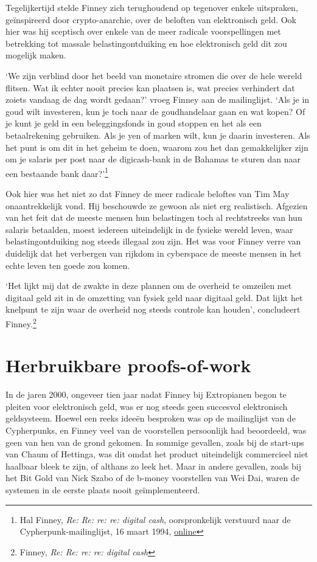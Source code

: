 \documentclass[
  a5paper,
  smalldemyvopaper,11pt,twoside,onecolumn,openright,extrafontsizes,
hidelinks]{memoir}
\begin{document}
Tegelijkertijd stelde Finney zich terughoudend op tegenover enkele
uitspraken, geïnspireerd door crypto-anarchie, over de beloften van
elektronisch geld. Ook hier was hij sceptisch over enkele van de meer
radicale voorspellingen met betrekking tot massale belastingontduiking
en hoe elektronisch geld dit zou mogelijk maken.

`We zijn verblind door het beeld van monetaire stromen die over de hele
wereld flitsen. Wat ik echter nooit precies kan plaatsen is, wat precies
verhindert dat zoiets vandaag de dag wordt gedaan?' vroeg Finney aan de
mailinglijst. `Als je in goud wilt investeren, kun je toch naar de
goudhandelaar gaan en wat kopen? Of je kunt je geld in een
beleggingsfonds in goud stoppen en het als een betaalrekening gebruiken.
Als je yen of marken wilt, kun je daarin investeren. Als het punt is om
dit in het geheim te doen, waarom zou het dan gemakkelijker zijn om je
salaris per post naar de digicash-bank in de Bahamas te sturen dan naar
een bestaande bank daar?'\footnote{Hal Finney, \emph{Re: Re: re: re:
  digital cash}, oorspronkelijk verstuurd naar de
  Cypherpunk-mailinglijst, 16 maart 1994,
  \href{https://cypherpunks.venona.com/date/1994/03/msg00694.html}{online}}

Ook hier was het niet zo dat Finney de meer radicale beloftes van Tim
May onaantrekkelijk vond. Hij beschouwde ze gewoon als niet erg
realistisch. Afgezien van het feit dat de meeste mensen hun belastingen
toch al rechtstreeks van hun salaris betaalden, moest iedereen
uiteindelijk in de fysieke wereld leven, waar belastingontduiking nog
steeds illegaal zou zijn. Het was voor Finney verre van duidelijk dat
het verbergen van rijkdom in cyberspace de meeste mensen in het echte
leven ten goede zou komen.

`Het lijkt mij dat de zwakte in deze plannen om de overheid te omzeilen
met digitaal geld zit in de omzetting van fysiek geld naar digitaal
geld. Dat lijkt het knelpunt te zijn waar de overheid nog steeds
controle kan houden', concludeert Finney.\footnote{Finney, \emph{Re: Re:
  re: re: digital cash}}

\section{Herbruikbare proofs-of-work}\label{herbruikbare-proofs-of-work}

In de jaren 2000, ongeveer tien jaar nadat Finney bij Extropianen begon
te pleiten voor elektronisch geld, was er nog steeds geen succesvol
elektronisch geldsysteem. Hoewel een reeks ideeën besproken was op de
mailinglijst van de Cypherpunks, en Finney veel van de voorstellen
persoonlijk had beoordeeld, was geen van hen van de grond gekomen. In
sommige gevallen, zoals bij de start-ups van Chaum of Hettinga, was dit
omdat het product uiteindelijk commercieel niet haalbaar bleek te zijn,
of althans zo leek het. Maar in andere gevallen, zoals bij het Bit Gold
van Nick Szabo of de b-money voorstellen van Wei Dai, waren de systemen
in de eerste plaats nooit geïmplementeerd.
\end{document}
